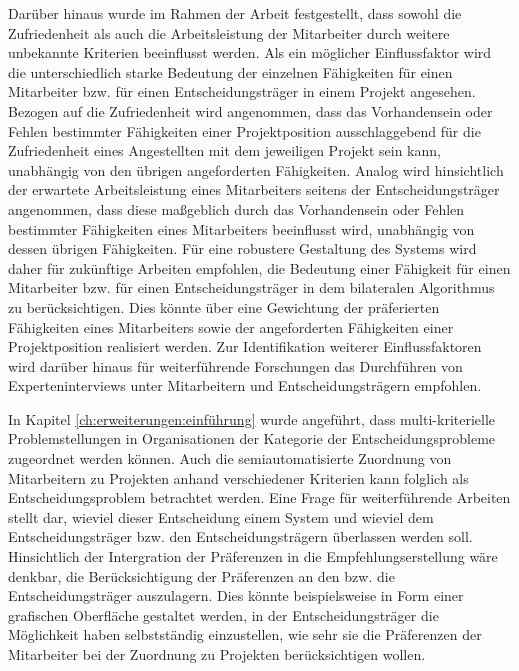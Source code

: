 Darüber hinaus wurde im Rahmen der Arbeit festgestellt, dass sowohl die Zufriedenheit als auch die Arbeitsleistung der Mitarbeiter durch weitere unbekannte Kriterien beeinflusst werden.
Als ein möglicher Einflussfaktor wird die unterschiedlich starke Bedeutung der einzelnen Fähigkeiten für einen Mitarbeiter bzw. für einen Entscheidungsträger in einem Projekt angesehen.
Bezogen auf die Zufriedenheit wird angenommen, dass das Vorhandensein oder Fehlen bestimmter Fähigkeiten einer Projektposition ausschlaggebend für die Zufriedenheit eines Angestellten mit dem jeweiligen Projekt sein kann, unabhängig von den übrigen angeforderten Fähigkeiten.
Analog wird hinsichtlich der erwartete Arbeitsleistung eines Mitarbeiters seitens der Entscheidungsträger angenommen, dass diese maßgeblich durch das Vorhandensein oder Fehlen bestimmter Fähigkeiten eines Mitarbeiters beeinflusst wird, unabhängig von dessen übrigen Fähigkeiten.
Für eine robustere Gestaltung des Systems wird daher für zukünftige Arbeiten empfohlen, die Bedeutung einer Fähigkeit für einen Mitarbeiter bzw. für einen Entscheidungsträger in dem bilateralen Algorithmus zu berücksichtigen.
Dies könnte über eine Gewichtung der präferierten Fähigkeiten eines Mitarbeiters sowie der angeforderten Fähigkeiten einer Projektposition realisiert werden.
Zur Identifikation weiterer Einflussfaktoren wird darüber hinaus für weiterführende Forschungen das Durchführen von Experteninterviews unter Mitarbeitern und Entscheidungsträgern empfohlen.

In Kapitel \ref{ch:erweiterungen:einführung} wurde angeführt, dass multi-kriterielle Problemstellungen in Organisationen der Kategorie der Entscheidungsprobleme zugeordnet werden können.
Auch die semiautomatisierte Zuordnung von Mitarbeitern zu Projekten anhand verschiedener Kriterien kann folglich als Entscheidungsproblem betrachtet werden.
Eine Frage für weiterführende Arbeiten stellt dar, wieviel dieser Entscheidung einem System und wieviel dem Entscheidungsträger bzw. den Entscheidungsträgern überlassen werden soll.
Hinsichtlich der Intergration der Präferenzen in die Empfehlungserstellung wäre denkbar, die Berücksichtigung der Präferenzen an den bzw. die Entscheidungsträger auszulagern.
Dies könnte beispielsweise in Form einer grafischen Oberfläche gestaltet werden, in der Entscheidungsträger die Möglichkeit haben selbstständig einzustellen, wie sehr sie die Präferenzen der Mitarbeiter bei der Zuordnung zu Projekten berücksichtigen wollen.

